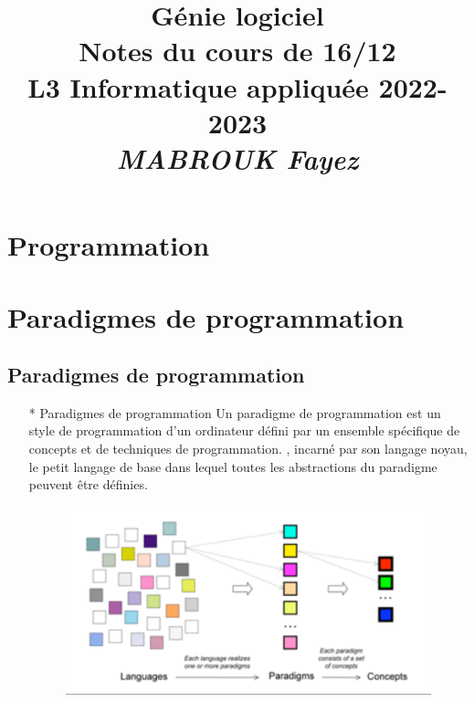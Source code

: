\documentclass[12pt]{article}
\title{{\bf  Génie logiciel} \\
	Notes du cours de 16/12  \\
	{\small L3 Informatique appliquée 2022-2023} \\
	{\it \small MABROUK Fayez}}
\begin{document}
	\maketitle
	\newpage
	\section{Programmation}
	\section{Paradigmes de programmation}
	\subsection{Paradigmes de programmation}
	\begin{itemize}
		\item[* ] Paradigmes de programmation
		Un paradigme de programmation est un style de programmation d'un ordinateur défini par un ensemble spécifique de concepts et de techniques de programmation.
		, incarné par son langage noyau, le petit langage de base dans lequel toutes les abstractions du paradigme peuvent être définies.
		\begin{figure}[!hbtp]
			\centering
			\includegraphics[scale=0.75]{Capture.PNG}
		\end{figure}
	\end{itemize}
\end{document}
